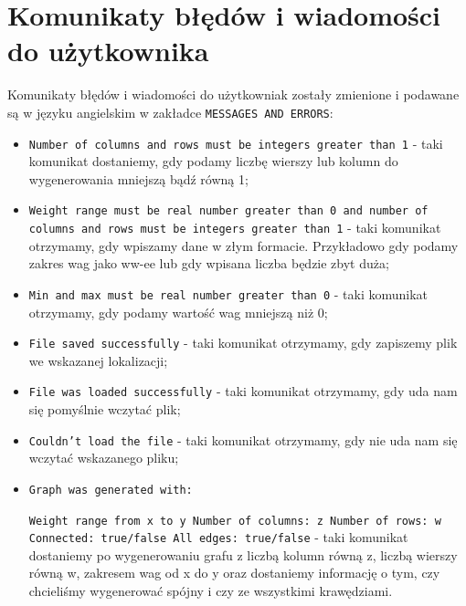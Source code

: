 \documentclass[]{article}
\begin{document}
\section{Komunikaty błędów i wiadomości do użytkownika}\label{header-n279}
Komunikaty błędów i wiadomości do użytkowniak zostały zmienione i podawane są w języku angielskim w zakładce \texttt{MESSAGES AND ERRORS}:
\begin{itemize}
\item
\texttt{Number of columns and rows must be integers greater than 1} - taki komunikat dostaniemy, gdy podamy liczbę wierszy lub kolumn do wygenerowania mniejszą bądź równą 1;
\item
\texttt{Weight range must be real number greater than 0 and number of columns and rows must be integers greater than 1} - taki komunikat otrzymamy, gdy wpiszamy dane w złym formacie. Przykładowo gdy podamy zakres wag jako ww-ee lub gdy wpisana liczba będzie zbyt duża;
\item
\texttt{Min and max must be real number greater than 0} - taki komunikat otrzymamy, gdy podamy wartość wag mniejszą niż 0;
\item
\texttt{File saved successfully} - taki komunikat otrzymamy, gdy zapiszemy plik we wskazanej lokalizacji;
\item
\texttt{File was loaded successfully} - taki komunikat otrzymamy, gdy uda nam się pomyślnie wczytać plik;
\item
\texttt{Couldn't load the file} - taki komunikat otrzymamy, gdy nie uda nam się wczytać wskazanego pliku;
\item
\texttt{Graph was generated with:}

\texttt{Weight range from x to y Number of columns: z Number of rows: w Connected: true/false All edges: true/false}
 - taki komunikat dostaniemy po wygenerowaniu grafu z liczbą kolumn równą z, liczbą wierszy równą w, zakresem wag od x do y oraz dostaniemy informację o tym, czy chcieliśmy wygenerować spójny i czy ze wszystkimi krawędziami.


\end{itemize}
\end{document}
